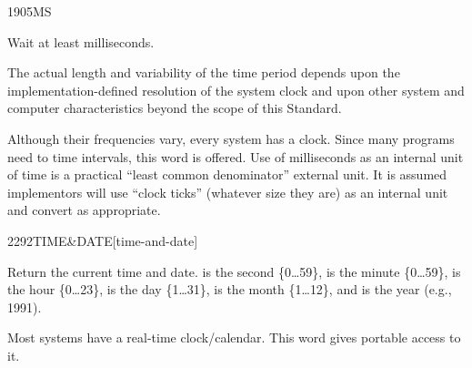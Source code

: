 \begin{worddef}{1905}{MS}
\item {}

	Wait at least  milliseconds.

\note
	The actual length and variability of the time period depends
	upon the implementation-defined resolution of the system clock
	and upon other system and computer characteristics beyond the
	scope of this Standard.

	\begin{rationale} %
		Although their frequencies vary, every system has a clock.
		Since many programs need to time intervals, this word is
		offered. Use of milliseconds as an internal unit of time is
		a practical ``least common denominator'' external unit. It
		is assumed implementors will use ``clock ticks'' (whatever
		size they are) as an internal unit and convert as appropriate.
	\end{rationale}
\end{worddef}


\begin{worddef}[TIMEandDATE]{2292}{TIME\&DATE}[time-and-date]
\item {}

	Return the current time and date.
	 is the second \{0{\ldots}59\},
	 is the minute \{0{\ldots}59\},
	 is the hour \{0{\ldots}23\},
	 is the day \{1{\ldots}31\},
	 is the month \{1{\ldots}12\}, and
	 is the year (e.g., 1991).

	\begin{rationale} %
		Most systems have a real-time clock/calendar.
		This word gives portable access to it.
	\end{rationale}
\end{worddef}
